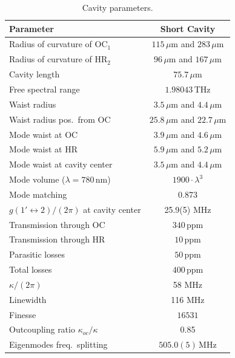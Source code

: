 \begin{table}[ht]
	\centering
	\begin{tabular}{l|c}
		\hline\hline
		Parameter                                         & Short Cavity                  \\
		\hline
		Radius of curvature of OC$_1$                     & $115\,\mu$m and $283\,\mu$m   \\
		Radius of curvature of HR$_2$                     & $96\,\mu$m and $167\,\mu$m    \\
		Cavity length                                     & $75.7\,\mu$m                  \\
		Free spectral range                               & $1.98043\,$THz                \\
		Waist radius                                      & $3.5\,\mu$m and $4.4\,\mu$m   \\
		Waist radius pos.\ from OC                        & $25.8\,\mu$m and $22.7\,\mu$m \\
		Mode waist at OC                                  & $3.9\,\mu$m and $4.6\,\mu$m   \\
		Mode waist at HR                                  & $5.9\,\mu$m and $5.2\,\mu$m   \\
		Mode waist at cavity center                       & $3.5\,\mu$m and $4.4\,\mu$m   \\
		Mode volume ($\lambda = 780\,$nm)                 & $1900 \cdot \lambda^3$        \\
		Mode matching                                     & 0.873                         \\
		$g(1' \leftrightarrow 2)/(2\pi)$ at cavity center & 25.9(5) MHz                   \\
		Transmission through OC                           & $340\,$ppm                    \\
		Transmission through HR                           & $10\,$ppm                     \\
		Parasitic losses                                  & $50\,$ppm                     \\
		Total losses                                      & $400\,$ppm                    \\
		$\kappa/(2\pi)$                                   & 58 MHz                        \\
		Linewidth                                         & 116 MHz                       \\
		Finesse                                           & $16531$                       \\
		Outcoupling ratio $\kappa_{oc}/\kappa$            & 0.85                          \\
		Eigenmodes freq.\ splitting                       & $505.0(5)\,$MHz               \\
		\hline\hline
	\end{tabular}
	\caption{Cavity parameters.}
	\label{tab:cavity_parameters}
\end{table}


